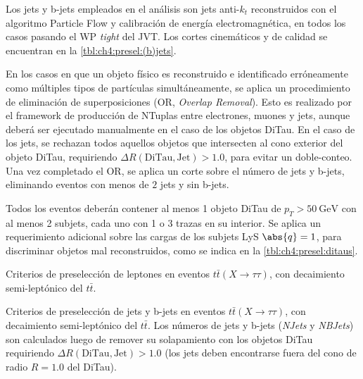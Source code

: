 Los jets y b-jets empleados en el análisis son jets anti-$k_t$ reconstruidos con el algoritmo Particle Flow y calibración de energía electromagnética, en todos los casos pasando el WP \textit{tight} del JVT. Los cortes cinemáticos y de calidad se encuentran en la \cref{tbl:ch4:presel:(b)jets}.

En los casos en que un objeto físico es reconstruido e identificado erróneamente como múltiples tipos de partículas simultáneamente, se aplica un procedimiento de eliminación de superposiciones (OR, \textit{Overlap Removal}). Esto es realizado por el framework de producción de NTuplas entre electrones, muones y jets, aunque deberá ser ejecutado manualmente en el caso de los objetos DiTau. En el caso de los jets, se rechazan todos aquellos objetos que intersecten al cono exterior del objeto DiTau, requiriendo $\Delta R(\text{DiTau}, \text{Jet}) > 1.0$, para evitar un doble-conteo. Una vez completado el OR, se aplica un corte sobre el número de jets y b-jets, eliminando eventos con menos de $2$ jets y sin b-jets.

Todos los eventos deberán contener al menos 1 objeto DiTau de $p_T > \SI{50}{\GeV}$ con al menos 2 subjets, cada uno con 1 o 3 trazas en su interior. Se aplica un requerimiento adicional sobre las cargas de los subjets LyS $\abs{q} = 1$, para discriminar objetos mal reconstruidos, como se indica en la \cref{tbl:ch4:presel:ditaus}.

\begin{table}[t]
    \small\centering
    \setlength{\tabcolsep}{1mm}
    
    \caption{Criterios de preselección de leptones en eventos $t\bar{t}(X\to\tau\tau)$, con decaimiento semi-leptónico del $t\bar{t}$.}
    \label{tbl:ch4:presel:leptons}
\end{table}

\begin{table}[t]
    \small\centering
    \setlength{\tabcolsep}{1mm}
    
    \caption{Criterios de preselección de jets y b-jets en eventos $t\bar{t}(X\to\tau\tau)$, con decaimiento semi-leptónico del $t\bar{t}$. Los números de jets y b-jets (\textit{NJets} y \textit{NBJets}) son calculados luego de remover su solapamiento con los objetos DiTau requiriendo $\Delta R(\text{DiTau}, \text{Jet}) > 1.0$ (los jets deben encontrarse fuera del cono de radio $R = 1.0$ del DiTau).}
    \label{tbl:ch4:presel:(b)jets}
\end{table}

